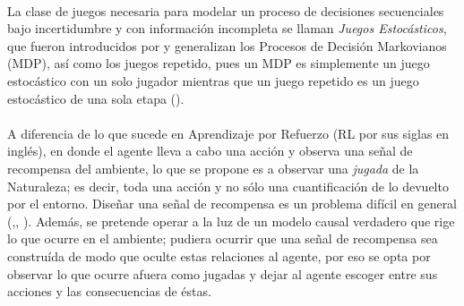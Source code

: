 \documentclass[11pt]{article}
\theoremstyle{plain}
\begin{document}
\\
La clase de juegos necesaria para modelar un proceso de decisiones secuenciales bajo incertidumbre y con información incompleta se llaman \textit{Juegos Estocásticos}, que fueron introducidos por \cite{shapley1953stochastic} y generalizan los Procesos de Decisión Markovianos (MDP), así como los juegos repetido, pues un MDP es simplemente un juego estocástico con un solo jugador mientras que un juego repetido es un juego estocástico de una sola etapa (\cite{shoham2008multiagent}).\\
\\
A diferencia de lo que sucede en Aprendizaje por Refuerzo (RL por sus siglas en inglés), en donde el agente lleva a cabo una acción y observa una señal de recompensa del ambiente, lo que se propone es a observar una \textit{jugada} de la Naturaleza; es decir, toda una acción y no sólo una cuantificación de lo devuelto por el entorno. Diseñar una señal de recompensa es un problema difícil en general (\cite{sutton1998reinforcement},\cite{dewey2014reinforcement}, \cite{DRLnotwork}). Además, se pretende operar a la luz de un modelo causal verdadero que rige lo que ocurre en el ambiente; pudiera ocurrir que una señal de recompensa sea construída de modo que oculte estas relaciones al agente, por eso se opta por observar lo que ocurre afuera como jugadas y dejar al agente escoger entre sus acciones y las consecuencias de éstas.
\end{document}
